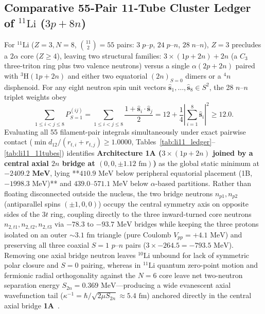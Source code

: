 \documentclass[11pt, a4paper]{article}
\begin{document}
\subsection{\texorpdfstring{Comparative 55-Pair 11-Tube Cluster Ledger of $^{11}\text{Li}$ ($3p + 8n$)}{Comparative 55-Pair 11-Tube Cluster Ledger of 11Li (3p + 8n)}}
For $^{11}\text{Li}$ ($Z = 3, N = 8$, $\binom{11}{2} = 55$ pairs: $3\;p\text{--}p$, $24\;p\text{--}n$, $28\;n\text{--}n$), $Z = 3$ precludes a $2\alpha$ core ($Z \ge 4$), leaving two structural families: \textbf{$3\times(1p+2n) + 2n$} (a $C_3$ three-triton ring plus two valence neutrons) versus a single $\alpha(2p+2n)$ paired with $^3\text{H}(1p+2n)$ and either two equatorial $(2n)_{S=0}$ dimers or a $^4n$ disphenoid. For any eight neutron spin unit vectors $\hat{\mathbf{s}}_1,\dots,\hat{\mathbf{s}}_8 \in S^2$, the 28 $n\text{--}n$ triplet weights obey
\begin{equation}
    \sum_{1 \le i < j \le 8} P_{S=1}^{(ij)} = \sum_{1 \le i < j \le 8} \frac{1 + \hat{\mathbf{s}}_i\cdot\hat{\mathbf{s}}_j}{2} = 12 + \frac{1}{4}\left|\sum_{i=1}^8 \hat{\mathbf{s}}_i\right|^2 \ge 12.0.
    \label{eq:8n_frustration}
\end{equation}
Evaluating all 55 filament-pair integrals simultaneously under exact pairwise contact ($\min d_{12}/(r_{t,i}+r_{t,j}) \ge 1.0000$, Tables~\ref{tab:li11_ledger}--\ref{tab:li11_11tubes}) identifies \textbf{Architecture 1A ($3\times(1p+2n)$ joined by a central axial $2n$ bridge at $(0, 0, \pm 1.12\text{ fm})$)} as the global static minimum at $\mathbf{-2409.2\text{ MeV}}$, lying **$410.9\text{ MeV}$ below peripheral equatorial placement (1B, $-1998.3\text{ MeV}$)** and $439.0\text{--}571.1\text{ MeV}$ below $\alpha$-based partitions. Rather than floating disconnected outside the nucleus, the two bridge neutrons $n_{p1}, n_{p2}$ (antiparallel spins $(\pm 1, 0, 0)$) occupy the central symmetry axis on opposite sides of the $3t$ ring, coupling directly to the three inward-turned core neutrons $n_{2,t1}, n_{2,t2}, n_{2,t3}$ via $-78.3$ to $-93.7\text{ MeV}$ bridges while keeping the three protons isolated on an outer $\sim 3.1\text{ fm}$ triangle (pure Coulomb $V_{pp} = +4.1\text{ MeV}$) and preserving all three coaxial $S = 1$ $p\text{--}n$ pairs ($3 \times -264.5 = -793.5\text{ MeV}$). Removing one axial bridge neutron leaves $^{10}\text{Li}$ unbound for lack of symmetric polar closure and $S = 0$ pairing, whereas in $^{11}\text{Li}$ quantum zero-point motion and fermionic radial orthogonality against the $N = 6$ core leave net two-neutron separation energy $S_{2n} = 0.369\text{ MeV}$—producing a wide evanescent axial wavefunction tail ($\kappa^{-1} = \hbar/\sqrt{2\mu S_{2n}} \approx 5.4\text{ fm}$) anchored directly in the central axial bridge \textbf{1A}~\cite{tanihata1985,tanihata2013}.
\end{document}
